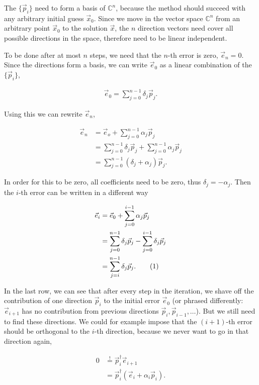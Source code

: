 \documentclass{article}
\newcommand\numberthis{\addtocounter{equation}{1}\tag{\theequation}}
\theoremstyle{plain} %
\theoremstyle{convention} %
\theoremstyle{remark} %
\numberwithin{equation}{section}
\begin{document}
The $\{\vec{p}_i\}$ need to form a basis of $\mathbb{C}^n$, because the method should succeed with any arbitrary initial guess $\vec{x}_0$. Since we move in the vector space $\mathbb{C}^n$ from an arbitrary point $\vec{x}_0$ to the solution $\vec{x}$, the $n$ direction vectors need cover all possible directions in the space, therefore need to be linear independent.

To be done after at most $n$ steps, we need that the $n$-th error is zero, $\vec{e}_n = 0$. Since the directions form a basis, we can write $\vec{e}_0$ as a linear combination of the $\{\vec{p}_i\}$,

\begin{align*}
    \vec{e}_{0} = \sum_{j=0}^{n-1} \delta_j \vec{p}_j.
\end{align*}

Using this we can rewrite $\vec{e}_n$,

\begin{align*}
    \vec{e}_{n} &= \vec{e}_o + \sum_{j=0}^{n-1} \alpha_j \vec{p}_j \\
                &= \sum_{j=0}^{n-1} \delta_j \vec{p}_j + \sum_{j=0}^{n-1} \alpha_j \vec{p}_j \\
                &= \sum_{j=0}^{n-1} (\delta_j + \alpha_j) \vec{p}_j.
\end{align*}

In order for this to be zero, all coefficients need to be zero, thus $\delta_j = - \alpha_j$. Then the $i$-th error can be written in a different way

\begin{align*}
    \vec{e}_{i} &= \vec{e}_0 + \sum_{j=0}^{i-1} \alpha_j \vec{p}_j \\
                &= \sum_{j=0}^{n-1} \delta_j \vec{p}_j - \sum_{j=0}^{i-1} \delta_j \vec{p}_j \\
                &= \sum_{j=i}^{n-1} \delta_j \vec{p}_j. \numberthis \label{eq:error_i}
\end{align*}

In the last row, we can see that after every step in the iteration, we shave off the contribution of one direction $\vec{p}_i$ to the initial error $\vec{e}_0$ (or phrased differently: $\vec{e}_{i+1}$ has no contribution from previous directions $\vec{p}_i, \vec{p}_{i-1}, \dots$). But we still need to find these directions. We could for example impose that the $(i+1)$-th error should be orthogonal to the $i$-th direction, because we never want to go in that direction again,

\begin{align*}
    0 &\stackrel{!}{=} \vec{p}_i^{\dagger} \vec{e}_{i+1} \\
                    &= \vec{p}_i^{\dagger} ( \vec{e}_{i} + \alpha_i \vec{p}_i ).
\end{align*}
\end{document}
